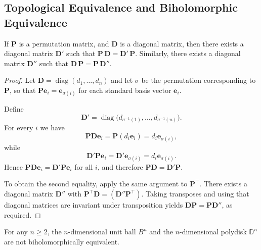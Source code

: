\subsection{Topological Equivalence and Biholomorphic Equivalence}
\begin{lemma}\label{lem:monomial_matrix_diagonal_multiplication_commute}
    If \(\symbf{P}\) is a permutation matrix, and \(\symbf{D}\) is a diagonal matrix, then there exists a diagonal matrix \(\symbf{D}'\) such that
    \(\symbf{P}\,\symbf{D}=\symbf{D}'\,\symbf{P}\). Similarly, there exists a diagonal matrix \(\symbf{D}''\) such that
    \(\symbf{D}\,\symbf{P}=\symbf{P}\,\symbf{D}''\).
\end{lemma}
\begin{proof}
    Let \(\symbf{D}=\operatorname{diag}(d_1,\dots,d_n)\) and let \(\sigma\) be the permutation corresponding to \(\symbf{P}\), so that \(\symbf{P}\symbf{e}_i=\symbf{e}_{\sigma(i)}\) for each standard basis vector \(\symbf{e}_i\).

    Define \[\symbf{D}'=\operatorname{diag}\bigl(d_{\sigma^{-1}(1)},\dots,d_{\sigma^{-1}(n)}\bigr).\]
    For every \(i\) we have
    \[\symbf{P}\symbf{D}\symbf{e}_i=\symbf{P}(d_i\symbf{e}_i)=d_i\symbf{e}_{\sigma(i)},\]
    while
    \[\symbf{D}'\symbf{P}\symbf{e}_i=\symbf{D}'\symbf{e}_{\sigma(i)}=d_i\symbf{e}_{\sigma(i)}.\]
    Hence \(\symbf{P}\symbf{D}\symbf{e}_i=\symbf{D}'\symbf{P}\symbf{e}_i\) for all \(i\), and therefore
    \(\symbf{P}\symbf{D}=\symbf{D}'\symbf{P}\).

    To obtain the second equality, apply the same argument to \(\symbf{P}^\top\). There exists a diagonal matrix \(\symbf{D}''\) with \(\symbf{P}^\top\symbf{D}=(\symbf{D}''\symbf{P}^\top)\). Taking transposes and using that diagonal matrices are invariant under transposition yields \(\symbf{D}\symbf{P}=\symbf{P}\symbf{D}''\), as required.
\end{proof}
\begin{theorem}[Poincaré]\label{thm:poincarepolydiskandunitball}
    For any \(n\geq2\), the \(n\)-dimensional unit ball \(B^n\) and the \(n\)-dimensional polydisk \(\mathbb{D}^n\) are not biholomorphically equivalent.
\end{theorem}
